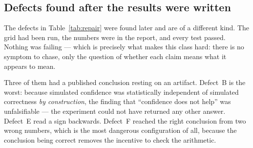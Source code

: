\documentclass[11pt,a4paper]{article}
\theoremstyle{plain}
\theoremstyle{definition}
\begin{document}
\subsection{Defects found after the results were written}
\label{sec:repairbugs}

The defects in Table~\ref{tab:repair} were found later and are of a
different kind. The grid had been run, the numbers were in the report,
and every test passed. Nothing was failing --- which is precisely what
makes this class hard: there is no symptom to chase, only the question
of whether each claim means what it appears to mean.

Three of them had a published conclusion resting on an artifact.
Defect~B is the worst: because simulated confidence was statistically
independent of simulated correctness \emph{by construction}, the finding
that ``confidence does not help'' was unfalsifiable --- the experiment
could not have returned any other answer. Defect~E read a sign
backwards. Defect~F reached the right conclusion from two wrong numbers,
which is the most dangerous configuration of all, because the conclusion
being correct removes the incentive to check the arithmetic.
\end{document}
